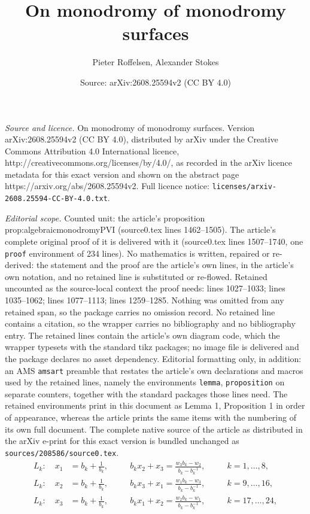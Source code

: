 \documentclass[10pt,a4paper]{amsart}
\title{On monodromy of monodromy surfaces}
\author{Pieter Roffelsen, Alexander Stokes}
\date{Source: arXiv:2608.25594v2 (CC BY 4.0)}
\begin{document}
\maketitle

\noindent\emph{Source and licence.} On monodromy of monodromy surfaces. Version arXiv:2608.25594v2 (CC BY 4.0), distributed by arXiv under the Creative Commons Attribution 4.0 International licence, http://creativecommons.org/licenses/by/4.0/, as recorded in the arXiv licence metadata for this exact version and shown on the abstract page https://arxiv.org/abs/2608.25594v2. Full licence notice: \texttt{licenses/arxiv-2608.25594-CC-BY-4.0.txt}.\par\smallskip

\noindent\textit{Editorial scope.} Counted unit: the article's proposition prop:algebraicmonodromyPVI (source0.tex lines 1462--1505). The article's complete original proof of it is delivered with it (source0.tex lines 1507--1740, one \texttt{proof} environment of 234 lines). No mathematics is written, repaired or re-derived: the statement and the proof are the article's own lines, in the article's own notation, and no retained line is substituted or re-flowed.  Retained uncounted as the source-local context the proof needs: lines 1027--1033; lines 1035--1062; lines 1077--1113; lines 1259--1285.  Nothing was omitted from any retained span, so the package carries no omission record.  No retained line contains a citation, so the wrapper carries no bibliography and no bibliography entry.  The retained lines contain the article's own diagram code, which the wrapper typesets with the standard tikz packages; no image file is delivered and the package declares no asset dependency.  Editorial formatting only, in addition: an AMS \texttt{amsart} preamble that restates the article's own declarations and macros used by the retained lines, namely the environments \texttt{lemma}, \texttt{proposition} on separate counters, together with the standard packages those lines need.  The retained environments print in this document as Lemma 1, Proposition 1 in order of appearance, whereas the article prints the same items with the numbering of its own full document.  The complete native source of the article as distributed in the arXiv e-print for this exact version is bundled unchanged as \texttt{sources/208586/source0.tex}.
\begin{equation}\label{eq:linesPVI}
\begin{aligned}
    L_k : \quad x_1 &= b_k+\frac{1}{b_k},\quad &&b_k x_2+x_3=\frac{w_3b_k-w_2}{b_k-b_k^{-1}}, \quad &&k=1,\dots,8, \\
    L_k :\quad  x_2 &= b_k+\frac{1}{b_k},\quad &&b_k x_3+x_1=\frac{w_1b_k-w_3}{b_k-b_k^{-1}}, \quad &&k=9,\dots,16, \\
    L_k : \quad x_3 &= b_k+\frac{1}{b_k},\quad &&b_k x_1+x_2=\frac{w_2b_k-w_1}{b_k-b_k^{-1}}, \quad &&k=17,\dots,24, 
\end{aligned}
\end{equation}
\end{document}
